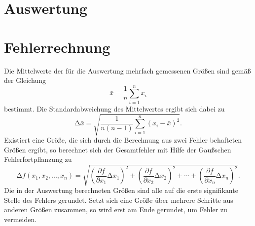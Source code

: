 \section{Auswertung}
\section{Fehlerrechnung}
\label{sec:auswertung}
Die Mittelwerte der für die Auswertung mehrfach gemessenen Größen sind
gemäß der Gleichung
\begin{equation}
    \bar{x}=\frac{1}{n}\sum_{i=1}^n x_i
    \label{eq:mittelwert}
\end{equation}
bestimmt. Die Standardabweichung des Mittelwertes ergibt sich dabei zu
\begin{equation}
    \mathup{\Delta}\bar{x}=\sqrt{\frac{1}{n(n-1)}\sum_{i=1}^n\left(x_i-\bar{x}\right)^2}.
    \label{eq:standardabweichung}
\end{equation}
Existiert eine Größe, die sich durch die Berechnung aus zwei Fehler behafteten Größen ergibt,
so berechnet sich der Gesamtfehler mit Hilfe der Gaußschen Fehlerfortpflanzung zu
\begin{equation}
    \mathup{\Delta}f(x_1,x_2,...,x_n)=\sqrt{\left(\frac{\partial f}{\partial x_1}\mathup{\Delta}x_1\right)^2+\left(\frac{\partial f}{\partial x_2}\mathup{\Delta}x_2\right)^2+ \dotsb +\left(\frac{\partial f}{\partial x_n}\mathup{\Delta}x_n\right)^2}.
    \label{eq:fehlerfortpflanzung}
\end{equation}
Die in der Auswertung berechneten Größen sind alle  auf die erste signifikante
Stelle des Fehlers gerundet. Setzt sich eine Größe über mehrere Schritte aus
anderen Größen zusammen, so wird erst am Ende gerundet, um Fehler zu vermeiden.

